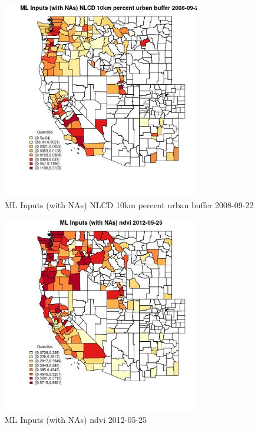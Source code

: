 \begin{figure} 
\centering  
\includegraphics[width=0.77\textwidth]{Code_Outputs/Report_ML_input_PM25_Step4_part_e_de_duplicated_aves_compiled_2019-05-18wNAs_CountyNLCD_10km_percent_urban_bufferMean2008-09-22_2008-09-22.jpg} 
\caption{\label{fig:Report_ML_input_PM25_Step4_part_e_de_duplicated_aves_compiled_2019-05-18wNAsCountyNLCD_10km_percent_urban_bufferMean2008-09-22_2008-09-22}ML Inputs (with NAs) NLCD 10km percent urban buffer 2008-09-22} 
\end{figure} 
 

\clearpage 

\begin{figure} 
\centering  
\includegraphics[width=0.77\textwidth]{Code_Outputs/Report_ML_input_PM25_Step4_part_e_de_duplicated_aves_compiled_2019-05-18wNAs_CountyndviMean2012-05-25_2012-05-25.jpg} 
\caption{\label{fig:Report_ML_input_PM25_Step4_part_e_de_duplicated_aves_compiled_2019-05-18wNAsCountyndviMean2012-05-25_2012-05-25}ML Inputs (with NAs) ndvi 2012-05-25} 
\end{figure} 
 

